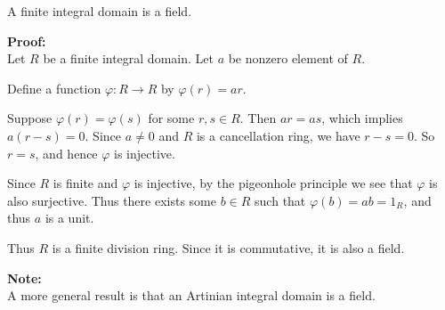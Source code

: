 \documentclass[12pt]{article}
\begin{document}
A finite integral domain is a field.

{\bf Proof:\\}
Let $R$ be a finite integral domain.  Let $a$ be nonzero element of $R$.

Define a function $\varphi \colon R \rightarrow R$ by $\varphi(r)=ar$.

Suppose $\varphi(r)=\varphi(s)$ for some $r,s \in R$.  Then $ar=as$, which implies $a(r-s)=0$.  Since $a \neq 0$ and $R$ is a cancellation ring, we have $r-s=0$.  So $r=s$, and hence $\varphi$ is injective.

Since $R$ is finite and $\varphi$ is injective, by the pigeonhole principle we see that $\varphi$ is also surjective.  Thus there exists some $b \in R$ such that $\varphi(b)= ab = 1_R$, and thus $a$ is a unit.

Thus $R$ is a finite division ring.  Since it is commutative, it is also a field.

{\bf Note:\\}
A more general result is that an Artinian integral domain is a field.
\end{document}
